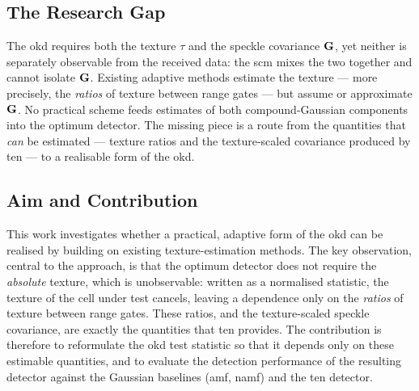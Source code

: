 \documentclass{article}
\begin{document}
\subsection{The Research Gap}
The \gls{okd} requires both the texture $\tau$ and the speckle covariance $\mathbf{G}$, yet neither is separately observable from the received data: the \gls{scm} mixes the two together and cannot isolate $\mathbf{G}$. Existing adaptive methods estimate the texture --- more precisely, the \emph{ratios} of texture between range gates --- but assume or approximate $\mathbf{G}$. No practical scheme feeds estimates of both compound-Gaussian components into the optimum detector. The missing piece is a route from the quantities that \emph{can} be estimated --- texture ratios and the texture-scaled covariance produced by \gls{ten} --- to a realisable form of the \gls{okd}.

\subsection{Aim and Contribution}
This work investigates whether a practical, adaptive form of the \gls{okd} can be realised by building on existing texture-estimation methods. The key observation, central to the approach, is that the optimum detector does not require the \emph{absolute} texture, which is unobservable: written as a normalised statistic, the texture of the cell under test cancels, leaving a dependence only on the \emph{ratios} of texture between range gates. These ratios, and the texture-scaled speckle covariance, are exactly the quantities that \gls{ten} provides. The contribution is therefore to reformulate the \gls{okd} test statistic so that it depends only on these estimable quantities, and to evaluate the detection performance of the resulting detector against the Gaussian baselines (\gls{amf}, \gls{namf}) and the \gls{ten} detector.
\end{document}
